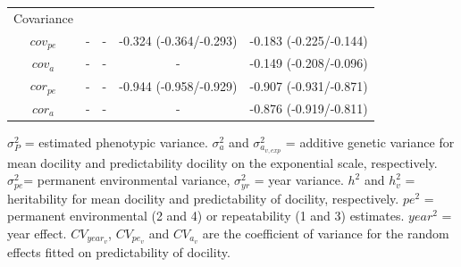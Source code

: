 \documentclass[a4paper,12pt,twoside]{article}
\begin{document}
\begin{table}[ht!]
\begin{tabular}{c c c c c}
			Covariance & & & &\\
			$cov_{pe}$ & - & - & -0.324 (-0.364/-0.293) & -0.183 (-0.225/-0.144)\\
			$cov_{a}$ & - & - & - & -0.149 (-0.208/-0.096)\\
			$cor_{pe}$ & - & - & -0.944 (-0.958/-0.929) & -0.907 (-0.931/-0.871)\\
			$cor_{a}$ & - & - & - & -0.876 (-0.919/-0.811)\\
			\hline
		\end{tabular}
		\begin{tablenotes}
			\small
			\item $\sigma_P^2$ = estimated phenotypic variance.
			$\sigma_a^2$ and $\sigma_{a_{v, exp}}^2$ = additive genetic variance for mean docility and predictability docility on the exponential scale, respectively. 
			$\sigma_{pe}^2$= permanent environmental variance, $\sigma_{yr}^2$ = year variance. 
			$h^2$ and $h_v^2$ = heritability for mean docility and predictability of docility, respectively. 
			$pe^2$ = permanent environmental (2 and 4) or repeatability (1 and 3) estimates. 
			$year^2$ = year effect.
			$CV_{year_v}$, $CV_{pe_v}$ and $CV_{a_v}$ are the coefficient of variance for the random effects fitted on predictability of docility.
		\end{tablenotes}
	\end{table}
	
	
	
	
	\newpage
\end{document}
